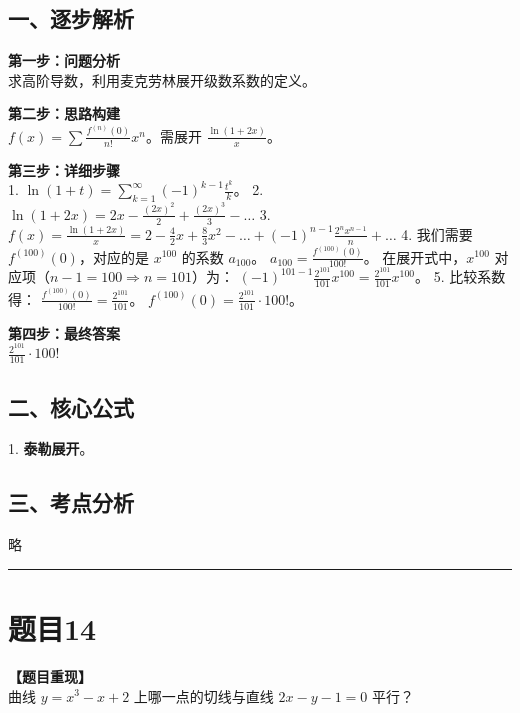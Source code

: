 \documentclass[12pt, a4paper]{ctexart}
\newcommand{\TopSeparator}{
    \par\noindent\rule{\textwidth}{1.5pt}\vspace{0.5em} %
}
\newenvironment{RedAnalysis}{
    \par
    \color{red} %
}{
    \par
    \color{black} %
}
\begin{document}
\begin{RedAnalysis}

\subsection*{一、逐步解析}

\textbf{第一步：问题分析} \\
求高阶导数，利用麦克劳林展开级数系数的定义。

\textbf{第二步：思路构建} \\
$f(x) = \sum \frac{f^{(n)}(0)}{n!} x^n$。需展开 $\frac{\ln(1+2x)}{x}$。

\textbf{第三步：详细步骤} \\
1. $\ln(1+t) = \sum_{k=1}^\infty (-1)^{k-1} \frac{t^k}{k}$。
2. $\ln(1+2x) = 2x - \frac{(2x)^2}{2} + \frac{(2x)^3}{3} - \dots$
3. $f(x) = \frac{\ln(1+2x)}{x} = 2 - \frac{4}{2}x + \frac{8}{3}x^2 - \dots + (-1)^{n-1} \frac{2^n x^{n-1}}{n} + \dots$
4. 我们需要 $f^{(100)}(0)$，对应的是 $x^{100}$ 的系数 $a_{100}$。
   $a_{100} = \frac{f^{(100)}(0)}{100!}$。
   在展开式中，$x^{100}$ 对应项（$n-1=100 \Rightarrow n=101$）为：
   $(-1)^{101-1} \frac{2^{101}}{101} x^{100} = \frac{2^{101}}{101} x^{100}$。
5. 比较系数得：
   $\frac{f^{(100)}(0)}{100!} = \frac{2^{101}}{101}$。
   $f^{(100)}(0) = \frac{2^{101}}{101} \cdot 100!$。

\textbf{第四步：最终答案} \\
$\frac{2^{101}}{101} \cdot 100!$

\subsection*{二、核心公式}
1. \textbf{泰勒展开}。

\subsection*{三、考点分析}
略

\end{RedAnalysis}

\vspace{2em}

\TopSeparator
\section*{题目14}

\textbf{【题目重现】} \\
曲线 $ y = x^{3} - x + 2 $ 上哪一点的切线与直线 $ 2x - y - 1 = 0 $ 平行？
\end{document}
